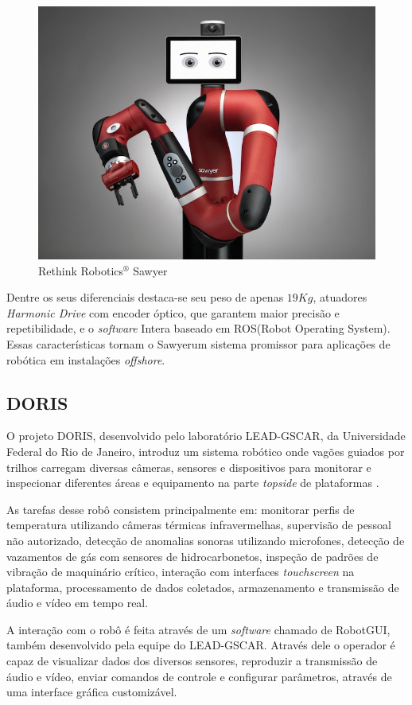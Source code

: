 \begin{figure}[!ht]
\centering
  \includegraphics[width=0.5\linewidth]{./img/sawyer.jpeg}
  \caption{Rethink Robotics$^\circledR$ Sawyer\texttrademark}
  \label{fig:sawyer}
\end{figure}%

Dentre os seus diferenciais destaca-se seu peso de apenas $19Kg$, atuadores \textit{Harmonic Drive} com encoder óptico, que garantem maior precisão e repetibilidade, e o \textit{software} Intera baseado em ROS(Robot Operating System). Essas características tornam o Sawyer\texttrademark um sistema promissor para aplicações de robótica em instalações \textit{offshore}.

\subsection{DORIS}
O projeto DORIS, desenvolvido pelo laboratório LEAD-GSCAR, da Universidade Federal do Rio de Janeiro, introduz um sistema robótico onde vagões guiados por trilhos carregam diversas câmeras, sensores e dispositivos para monitorar e inspecionar diferentes áreas e equipamento na parte \textit{topside} de plataformas \citep{nunes2013doris, galassi2014doris, freitas2015embedded}.

As tarefas desse robô consistem principalmente em: monitorar perfis de temperatura utilizando câmeras térmicas infravermelhas, supervisão de pessoal não autorizado, detecção de anomalias sonoras utilizando microfones, detecção de vazamentos de gás com sensores de hidrocarbonetos, inspeção de padrões de vibração de maquinário crítico, interação com interfaces \textit{touchscreen} na plataforma, processamento de dados coletados, armazenamento e transmissão de áudio e vídeo em tempo real.

A interação com o robô é feita através de um \textit{software} chamado de RobotGUI, também desenvolvido pela equipe do LEAD-GSCAR. Através dele o operador é capaz de visualizar dados dos diversos sensores, reproduzir a transmissão de áudio e vídeo, enviar comandos de controle e configurar parâmetros, através de uma interface gráfica customizável. 

